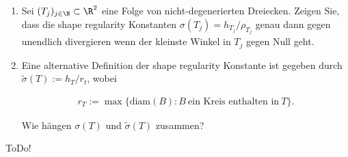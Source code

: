 
\begin{exercise}

\begin{enumerate}[label = \textbf{\alph*)}]
  \item Sei $(T_j)_{j \in \N} \subset \R^2$ eine Folge von nicht-degenerierten Dreiecken.
  Zeigen Sie, dass die shape regularity Konstanten $\sigma(T_j) = h_{T_j} / \rho_{T_j}$ genau dann gegen unendlich divergieren
  wenn der kleinste Winkel in $T_j$ gegen Null geht.
  \item Eine alternative Definition der shape regularity Konstante ist gegeben durch
  $\tilde{\sigma}(T) := h_T / r_t$, wobei

  \begin{align*}
    r_T := \max\{\text{diam}(B): B~ \text{ein Kreis enthalten in}~ T\}.
  \end{align*}

  Wie hängen $\sigma(T)$ und $\tilde{\sigma}(T)$ zusammen?
\end{enumerate}

\end{exercise}


\begin{solution}

ToDo!

\end{solution}

